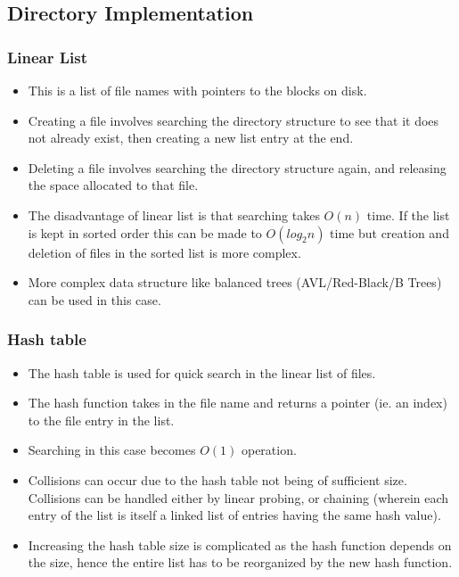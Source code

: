 \documentclass{article}
\theoremstyle{plain}
\theoremstyle{definition}
\begin{document}
\subsection{Directory Implementation}

\subsubsection{Linear List}
\begin{itemize}
    \item This is a list of file names with pointers to the blocks on disk.
    
    \item Creating a file involves searching the directory structure to see that it does not already exist, then creating a new list entry at the end.
    
    \item Deleting a file involves searching the directory structure again, and releasing the space allocated to that file. 
    
    \item The disadvantage of linear list is that searching takes $O(n)$ time. If the list is kept in sorted order this can be made to $O(log_2n)$ time but creation and deletion of files in the sorted list is more complex. 
    
    \item More complex data structure like balanced trees (AVL/Red-Black/B Trees) can be used in this case. 
\end{itemize}

\subsubsection{Hash table}
\begin{itemize}
    \item The hash table is used for quick search in the linear list of files.
    
    \item The hash function takes in the file name and returns a pointer (ie. an index) to the file entry in the list.
    
    \item Searching in this case becomes $O(1)$ operation. 
    
    \item Collisions can occur due to the hash table not being of sufficient size. Collisions can be handled either by linear probing, or chaining (wherein each entry of the list is itself a linked list of entries having the same hash value). 
    
    \item Increasing the hash table size is complicated as the hash function depends on the size, hence the entire list has to be reorganized by the new hash function. 
\end{itemize}
\end{document}
